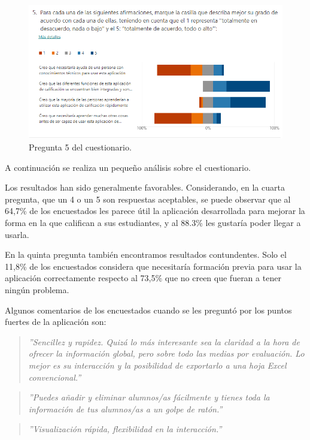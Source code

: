\begin{figure}[h]
\centering\includegraphics[width=1\linewidth]{figs/pregunta5.png}
\caption{Pregunta 5 del cuestionario.}
\label{Fig:pregunta5}
\end{figure}

A continuación se realiza un pequeño análisis sobre el cuestionario.

Los resultados han sido generalmente favorables. Considerando, en la cuarta pregunta, que un 4 o un 5 son respuestas aceptables, se puede observar que al 64,7\% de los encuestados les parece útil la aplicación desarrollada para mejorar la forma en la que califican a sus estudiantes, y al 88.3\% les gustaría poder llegar a usarla.

En la quinta pregunta también encontramos resultados contundentes. Solo el 11,8\% de los encuestados considera que necesitaría formación previa para usar la aplicación correctamente respecto al 73,5\% que no creen que fueran a tener ningún problema.

Algunos comentarios de los encuestados cuando se les preguntó por los puntos fuertes de la aplicación son:
\begin{quote}
\textit{''Sencillez y rapidez. Quizá lo más interesante sea la claridad a la hora de ofrecer la información global, pero sobre todo las medias por evaluación. Lo mejor es su interacción y la posibilidad de exportarlo a una hoja Excel convencional.''}
\end{quote}

\begin{quote}
\textit{''Puedes añadir y eliminar alumnos/as fácilmente y tienes toda la información de tus alumnos/as a un golpe de ratón.''}
\end{quote}

\begin{quote}
\textit{''Visualización rápida, flexibilidad en la interacción.''}
\end{quote}

